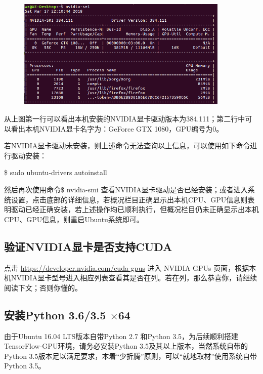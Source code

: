 \documentclass[11pt,a4paper]{ctexart}
\begin{document}
\begin{figure}[h]
\begin{center}
\includegraphics[width=0.9\textwidth]{NIVIDIA_Info} 
\end{center}
\end{figure}
\vspace{-0.5cm}
从上图第一行可以看出本机安装的NVIDIA显卡驱动版本为384.111；第二行中可以看出本机NVIDIA显卡名字为：GeForce GTX 1080，GPU编号为0。

若NVIDIA显卡驱动未安装，则上述命令无法查询以上信息，可以使用如下命令进行驱动安装：
\begin{center}
\$ sudo ubuntu-drivers autoinstall 
\end{center}
然后再次使用命令\$ nvidia-smi 查看NVIDIA显卡驱动是否已经安装；或者进入系统设置，点击底部的详细信息，若概况栏目正确显示出本机CPU、GPU信息则表明驱动已经正确安装，若上述操作均已顺利执行，但概况栏目仍未正确显示出本机CPU、GPU信息，则重启Ubuntu系统即可。


\subsection{验证NVIDIA显卡是否支持CUDA}
点击 \url{https://developer.nvidia.com/cuda-gpus} 进入 NVIDIA GPUs 页面，根据本机NVIDIA显卡型号进入相应列表查看其是否在列。若在列，那么恭喜你，请继续阅读下文；否则你懂的。

\subsection{安装Python 3.6/3.5 $\times $64 }
由于Ubuntu 16.04 LTS版本自带Python 2.7 和Python 3.5，为后续顺利搭建TensorFlow-GPU环境，请务必安装Python 3.5及其以上版本，当然系统自带的Python 3.5版本足以满足要求，本着“少折腾”原则，可以“就地取材”使用系统自带Python 3.5。
\end{document}
